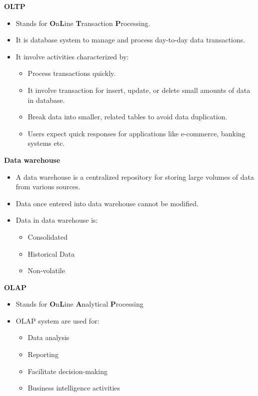 \begin{flushleft}
	
	
	\textbf{OLTP}
	\begin{itemize}
		\item Stands for \textbf{O}n\textbf{L}ine \textbf{T}ransaction \textbf{P}rocessing.
		\item It is database system to manage and process day-to-day data transactions.
		\item It involve activities characterized by:
		\begin{itemize}
			\item Process transactions quickly.
			\item It involve transaction for insert, update, or delete small amounts of data in database.
			\item Break data into smaller, related tables to avoid data duplication.
			\item Users expect quick responses for applications like e-commerce, banking systems etc.
		\end{itemize}
	\end{itemize}
	
	\bigskip
	\textbf{Data warehouse}
	\begin{itemize}
		\item A data warehouse is a centralized repository for storing large volumes of data from various sources. 
		\item Data once entered into data warehouse cannot be modified.
		\item Data in data warehouse is:
		\begin{itemize}
			\item Consolidated
			\item Historical Data
			\item Non-volatile
		\end{itemize}
		\bigskip
	\end{itemize}

	\textbf{OLAP}
	\begin{itemize}
		\item Stands for \textbf{O}n\textbf{L}ine \textbf{A}nalytical \textbf{P}rocessing
		\item OLAP system are used for:
		\begin{itemize}
			\item Data analysis
			\item Reporting
			\item Facilitate decision-making 
			\item Business intelligence activities
		\end{itemize}
	\end{itemize}


\end{flushleft}
